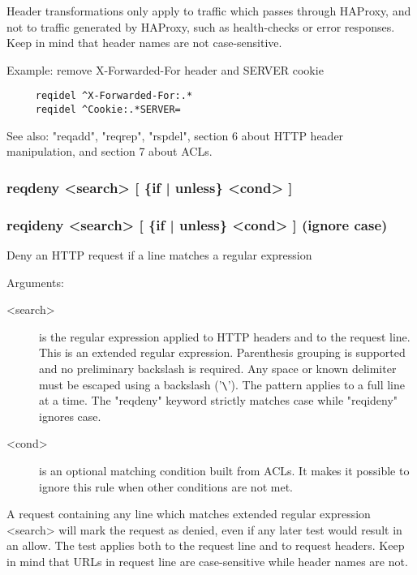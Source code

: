   Header transformations only apply to traffic which passes through HAProxy,
  and not to traffic generated by HAProxy, such as health-checks or error
  responses. Keep in mind that header names are not case-sensitive.

  Example: remove X-Forwarded-For header and SERVER cookie
\begin{verbatim}
     reqidel ^X-Forwarded-For:.*
     reqidel ^Cookie:.*SERVER=
\end{verbatim}

  See also: "reqadd", "reqrep", "rspdel", section 6 about HTTP header
            manipulation, and section 7 about ACLs.

\subsubsection[reqdeny]{reqdeny  <search> [ \{if | unless\} <cond> ]}
\subsubsection[reqideny]{reqideny <search> [ \{if | unless\} <cond> ]  (ignore case)}


  Deny an HTTP request if a line matches a regular expression


  Arguments:
\begin{description}
\item[<search>]  is the regular expression applied to HTTP headers and to the
              request line. This is an extended regular expression. Parenthesis
              grouping is supported and no preliminary backslash is required.
              Any space or known delimiter must be escaped using a backslash
              ('\verb|\|'). The pattern applies to a full line at a time. The
              "reqdeny" keyword strictly matches case while "reqideny" ignores
              case.

\item[<cond>] is an optional matching condition built from ACLs. It makes it
              possible to ignore this rule when other conditions are not met.
\end{description}

  A request containing any line which matches extended regular expression
  <search> will mark the request as denied, even if any later test would
  result in an allow. The test applies both to the request line and to request
  headers. Keep in mind that URLs in request line are case-sensitive while
  header names are not.

